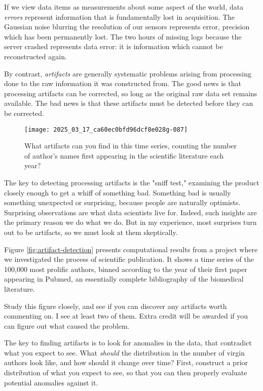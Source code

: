 \documentclass[10pt]{article}
\begin{document}
If we view data items as measurements about some aspect of the world, data \emph{errors} represent information that is fundamentally lost in acquisition. The Gaussian noise blurring the resolution of our sensors represents error, precision which has been permanently lost. The two hours of missing logs because the server crashed represents data error: it is information which cannot be reconstructed again.

By contrast, \emph{artifacts} are generally systematic problems arising from processing done to the raw information it was constructed from. The good news is that processing artifacts can be corrected, so long as the original raw data set remains available. The bad news is that these artifacts must be detected before they can be corrected.


\begin{figure}[ht]
  \centering
  \texttt{[image: 2025\_03\_17\_ca60ec0bfd96dcf8e028g-087]}
  \caption{What artifacts can you find in this time series, counting the number of author's names first appearing in the scientific literature each year?}
\end{figure}

The key to detecting processing artifacts is the "sniff test," examining the product closely enough to get a whiff of something bad. Something bad is usually something unexpected or surprising, because people are naturally optimists. Surprising observations are what data scientists live for. Indeed, such insights are the primary reason we do what we do. But in my experience, most surprises turn out to be artifacts, so we must look at them skeptically.

Figure \ref{fig:artifact-detection} presents computational results from a project where we investigated the process of scientific publication. It shows a time series of the 100,000 most prolific authors, binned according to the year of their first paper appearing in Pubmed, an essentially complete bibliography of the biomedical literature.

Study this figure closely, and see if you can discover any artifacts worth commenting on. I see at least two of them. Extra credit will be awarded if you can figure out what caused the problem.

The key to finding artifacts is to look for anomalies in the data, that contradict what you expect to see. What \emph{should} the distribution in the number of virgin authors look like, and how should it change over time? First, construct a prior distribution of what you expect to see, so that you can then properly evaluate potential anomalies against it.
\end{document}
